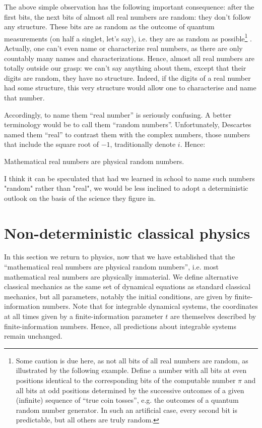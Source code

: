\documentclass[floatfix,12pt]{article}
\begin{document}
The above simple observation has the following important consequence: after the first bits, the next bits of almost all real numbers are random: they don't follow any structure. These bits are as random as the outcome of quantum measurements (on half a singlet, let's say), i.e. they are as random as possible\footnote{Some caution is due here, as not all bits of all real numbers are random, as illustrated by the following example. Define a number with all bits at even positions identical to the corresponding bits of the computable number $\pi$ and all bits at odd positions determined by the successive outcomes of a given (infinite) sequence of ``true coin tosses'', e.g. the outcomes of a quantum random number generator. In such an artificial case, every second bit is predictable, but all others are truly random.\label{randomPi}} \cite{Chaitin}. Actually, one can't even name or characterize real numbers, as there are only countably many names and characterizations. Hence, almost all real numbers are totally outside our grasp: we can't say anything about them, except that their digits are random, they have no structure. Indeed, if the digits of a real number had some structure, this very structure would allow one to characterise and name that number.

Accordingly, to name them ``real number'' is seriously confusing. A better terminology would be to call them ``random numbers''. Unfortunately, Descartes named them ``real'' to contrast them with the complex numbers, those numbers that include the square root of $-1$, traditionally denote $i$. Hence:

Mathematical real numbers are physical random numbers.

I think it can be speculated that had we learned in school to name such numbers "random" rather than "real", we would be less inclined to adopt a deterministic outlook on the basis of the science they figure in. 


\section{Non-deterministic classical physics}\label{ndcm}
In this section we return to physics, now that we have established that the ``mathematical real numbers are physical random numbers'', i.e. most mathematical real numbers are physically immaterial. We define alternative classical mechanics as the same set of dynamical equations as standard classical mechanics, but all parameters, notably the initial conditions, are given by finite-information numbers. Note that for integrable dynamical systems, the coordinates at all times given by a finite-information parameter $t$ are themselves described by finite-information numbers. Hence, all predictions about integrable systems remain unchanged.
\end{document}
